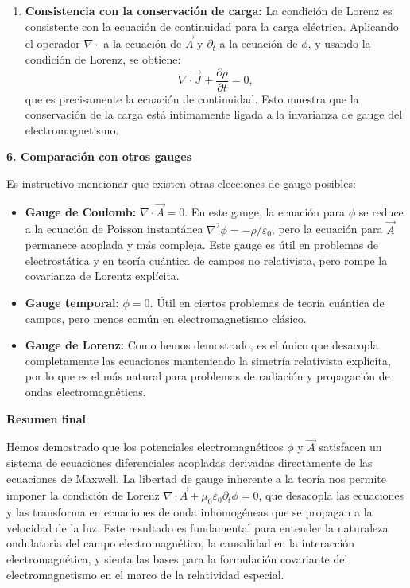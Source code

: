 \documentclass[a4paper]{article}
\begin{document}
\begin{enumerate}
\item \textbf{Consistencia con la conservación de carga:} La condición de Lorenz es consistente con la ecuación de continuidad para la carga eléctrica. Aplicando el operador $\nabla \cdot$ a la ecuación de $\vec{A}$ y $\partial_t$ a la ecuación de $\phi$, y usando la condición de Lorenz, se obtiene:
$$
\nabla \cdot \vec{J} + \frac{\partial \rho}{\partial t} = 0,
$$
que es precisamente la ecuación de continuidad. Esto muestra que la conservación de la carga está íntimamente ligada a la invarianza de gauge del electromagnetismo.
\end{enumerate}

\vspace{0.3cm}
\noindent\textbf{6. Comparación con otros gauges}

Es instructivo mencionar que existen otras elecciones de gauge posibles:

\begin{itemize}
\item \textbf{Gauge de Coulomb:} $\nabla \cdot \vec{A} = 0$. En este gauge, la ecuación para $\phi$ se reduce a la ecuación de Poisson instantánea $\nabla^2\phi = -\rho/\varepsilon_0$, pero la ecuación para $\vec{A}$ permanece acoplada y más compleja. Este gauge es útil en problemas de electrostática y en teoría cuántica de campos no relativista, pero rompe la covarianza de Lorentz explícita.

\item \textbf{Gauge temporal:} $\phi = 0$. Útil en ciertos problemas de teoría cuántica de campos, pero menos común en electromagnetismo clásico.

\item \textbf{Gauge de Lorenz:} Como hemos demostrado, es el único que desacopla completamente las ecuaciones manteniendo la simetría relativista explícita, por lo que es el más natural para problemas de radiación y propagación de ondas electromagnéticas.
\end{itemize}

\vspace{0.3cm}
\noindent\textbf{Resumen final}

Hemos demostrado que los potenciales electromagnéticos $\phi$ y $\vec{A}$ satisfacen un sistema de ecuaciones diferenciales acopladas derivadas directamente de las ecuaciones de Maxwell. La libertad de gauge inherente a la teoría nos permite imponer la condición de Lorenz $\nabla \cdot \vec{A} + \mu_0\varepsilon_0 \partial_t \phi = 0$, que desacopla las ecuaciones y las transforma en ecuaciones de onda inhomogéneas que se propagan a la velocidad de la luz. Este resultado es fundamental para entender la naturaleza ondulatoria del campo electromagnético, la causalidad en la interacción electromagnética, y sienta las bases para la formulación covariante del electromagnetismo en el marco de la relatividad especial.
\end{document}
